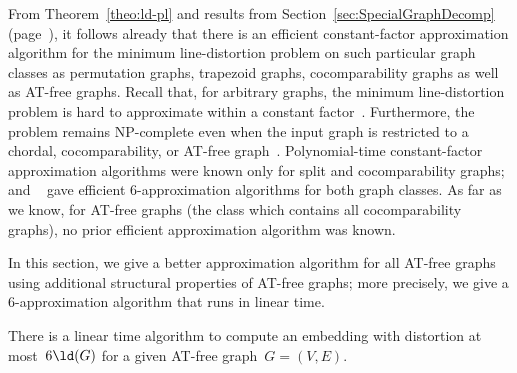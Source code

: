 From Theorem~\ref{theo:ld-pl} and results from Section~\ref{sec:SpecialGraphDecomp} (page~\pageref{sec:SpecialGraphDecomp}), it follows already that there is an efficient constant-factor approximation algorithm for the minimum line-distortion problem on such particular graph classes as permutation graphs, trapezoid graphs, cocomparability graphs as well as AT-free graphs.
Recall that, for arbitrary graphs, the minimum line-distortion problem is hard to approximate within a constant factor~\cite{BadDhaGupRab2005}.
Furthermore, the problem remains NP-complete even when the input graph is restricted to a chordal, cocomparability, or AT-free graph~\cite{HeggerMeiste2010}.
Polynomial-time constant-factor approximation algorithms were known only for split and cocomparability graphs;  and ~\cite{HeggerMeiste2010} gave efficient $6$-approximation algorithms for both graph classes.
As far as we know, for AT-free graphs (the class which contains all cocomparability graphs), no prior efficient approximation algorithm was known.

In this section, we give a better approximation algorithm for all AT-free graphs using additional structural properties of AT-free graphs; more precisely, we give a $6$-approximation algorithm that runs in linear time.


\begin{theorem}
    \label{theo:ATfreeLineApprox}
There is a linear time algorithm to compute an embedding with distortion at most~\( 6 \ld(G) \) for a given AT-free graph~\( G = (V, E) \).
\end{theorem}

